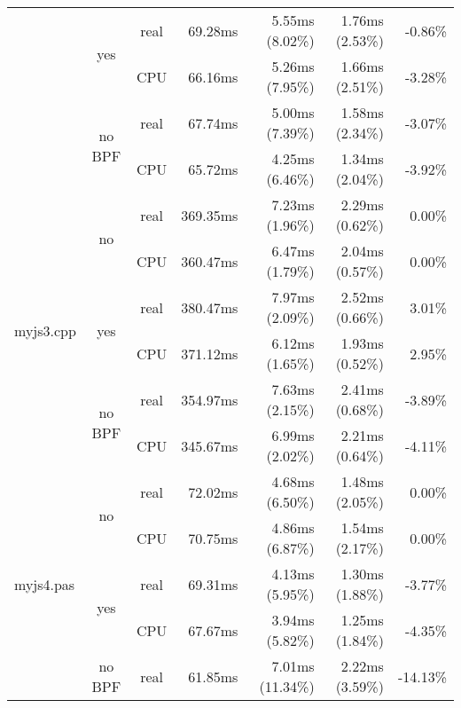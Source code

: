 \documentclass[en]{pracamgr}
\begin{document}
\begin{appendices}
\begin{small}
\begin{longtable}{|l|c|c|r|r|r|r|}
                            \cline{2-7}
                            & \multirow{2}{*}{yes}    & real & 69.28ms & 5.55ms (8.02\%) & 1.76ms (2.53\%) & -0.86\% \\*
                            &                         & CPU  & 66.16ms & 5.26ms (7.95\%) & 1.66ms (2.51\%) & -3.28\% \\*
                            \cline{2-7}
                            & \multirow{2}{*}{no BPF} & real & 67.74ms & 5.00ms (7.39\%) & 1.58ms (2.34\%) & -3.07\% \\*
                            &                         & CPU  & 65.72ms & 4.25ms (6.46\%) & 1.34ms (2.04\%) & -3.92\% \\
\hline
\multirow{6}{*}{myjs3.cpp}  & \multirow{2}{*}{no}     & real & 369.35ms & 7.23ms (1.96\%) & 2.29ms (0.62\%) & 0.00\% \\*
                            &                         & CPU  & 360.47ms & 6.47ms (1.79\%) & 2.04ms (0.57\%) & 0.00\% \\*
                            \cline{2-7}
                            & \multirow{2}{*}{yes}    & real & 380.47ms & 7.97ms (2.09\%) & 2.52ms (0.66\%) & 3.01\% \\*
                            &                         & CPU  & 371.12ms & 6.12ms (1.65\%) & 1.93ms (0.52\%) & 2.95\% \\*
                            \cline{2-7}
                            & \multirow{2}{*}{no BPF} & real & 354.97ms & 7.63ms (2.15\%) & 2.41ms (0.68\%) & -3.89\% \\*
                            &                         & CPU  & 345.67ms & 6.99ms (2.02\%) & 2.21ms (0.64\%) & -4.11\% \\
\hline
\multirow{6}{*}{myjs4.pas}  & \multirow{2}{*}{no}     & real & 72.02ms & 4.68ms (6.50\%) & 1.48ms (2.05\%) & 0.00\% \\*
                            &                         & CPU  & 70.75ms & 4.86ms (6.87\%) & 1.54ms (2.17\%) & 0.00\% \\*
                            \cline{2-7}
                            & \multirow{2}{*}{yes}    & real & 69.31ms & 4.13ms (5.95\%) & 1.30ms (1.88\%) & -3.77\% \\*
                            &                         & CPU  & 67.67ms & 3.94ms (5.82\%) & 1.25ms (1.84\%) & -4.35\% \\*
                            \cline{2-7}
                            & \multirow{2}{*}{no BPF} & real & 61.85ms & 7.01ms (11.34\%) & 2.22ms (3.59\%) & -14.13\% \\*

\end{longtable}
\end{small}
\end{appendices}
\end{document}
